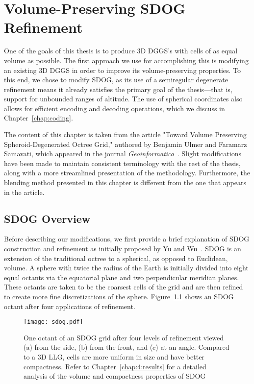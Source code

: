 \chapter{Volume-Preserving SDOG Refinement} \label{chap:sdog}
One of the goals of this thesis is to produce 3D DGGS's with cells of as equal volume as possible.
The first approach we use for accomplishing this is modifying an existing 3D DGGS in order to improve its volume-preserving properties.
To this end, we chose to modify SDOG, as its use of a semiregular degenerate refinement means it already satisfies the primary goal of the thesis---that is, support for unbounded ranges of altitude.
The use of spherical coordinates also allows for efficient encoding and decoding operations, which we discuss in Chapter~\ref{chap:coding}.

The content of this chapter is taken from the article "Toward Volume Preserving Spheroid-Degenerated Octree Grid," authored by Benjamin Ulmer and Faramarz Samavati, which appeared in the journal \textit{Geoinformatica}~\cite{ulmer2020toward}.
Slight modifications have been made to maintain consistent terminology with the rest of the thesis, along with a more streamlined presentation of the methodology. Furthermore, the blending method presented in this chapter is different from the one that appears in the article.


\section{SDOG Overview} \label{chap:4:sdog}
Before describing our modifications, we first provide a brief explanation of SDOG construction and refinement as initially proposed by Yu and Wu~\cite{yu2009sdog}.
SDOG is an extension of the traditional octree to a spherical, as opposed to Euclidean, volume.
A sphere with twice the radius of the Earth is initially divided into eight equal octants via the equatorial plane and two perpendicular meridian planes.
These octants are taken to be the coarsest cells of the grid and are then refined to create more fine discretizations of the sphere.
Figure~\ref{fig:sdog} shows an SDOG octant after four applications of refinement.


\begin{figure}[ht!]
	\centering
	\texttt{[image: sdog.pdf]}
	\caption[Title]{
		One octant of an SDOG grid after four levels of refinement viewed (a) from the side, (b) from the front, and (c) at an angle.
		Compared to a 3D LLG, cells are more uniform in size and have better compactness.
		Refer to Chapter~\ref{chap:4:results} for a detailed analysis of the volume and compactness properties of SDOG
	}
	\label{fig:sdog}
\end{figure}


